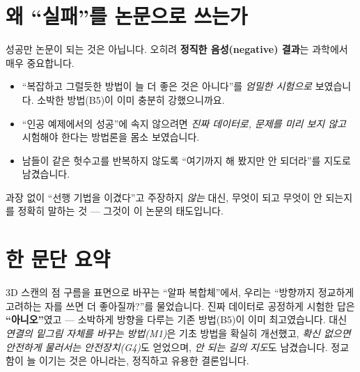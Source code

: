 \documentclass[11pt]{article}
\begin{document}
\section{왜 ``실패''를 논문으로 쓰는가}

성공만 논문이 되는 것은 아닙니다. 오히려 \textbf{정직한 음성(negative) 결과}는
과학에서 매우 중요합니다.
\begin{itemize}[leftmargin=1.4em]
  \item ``복잡하고 그럴듯한 방법이 늘 더 좋은 것은 아니다''를 \emph{엄밀한 시험으로}
  보였습니다. 소박한 방법(B5)이 이미 충분히 강했으니까요.
  \item ``인공 예제에서의 성공''에 속지 않으려면 \emph{진짜 데이터로, 문제를 미리 보지
  않고} 시험해야 한다는 방법론을 몸소 보였습니다.
  \item 남들이 같은 헛수고를 반복하지 않도록 ``여기까지 해 봤지만 안 되더라''를 지도로
  남겼습니다.
\end{itemize}
과장 없이 ``선행 기법을 이겼다''고 주장하지 \emph{않는} 대신, 무엇이 되고 무엇이 안 되는지를
정확히 말하는 것 --- 그것이 이 논문의 태도입니다.

\section*{한 문단 요약}
3D 스캔의 점 구름을 표면으로 바꾸는 ``알파 복합체''에서, 우리는 ``방향까지 정교하게
고려하는 자를 쓰면 더 좋아질까?''를 물었습니다. 진짜 데이터로 공정하게 시험한 답은
\textbf{``아니오''}였고 --- 소박하게 방향을 다루는 기존 방법(B5)이 이미 최고였습니다.
대신 \emph{연결의 밑그림 자체를 바꾸는 방법(M1)}은 기초 방법을 확실히 개선했고,
\emph{확신 없으면 안전하게 물러서는 안전장치(G4)}도 얻었으며, \emph{안 되는 길의 지도}도
남겼습니다. 정교함이 늘 이기는 것은 아니라는, 정직하고 유용한 결론입니다.
\end{document}
